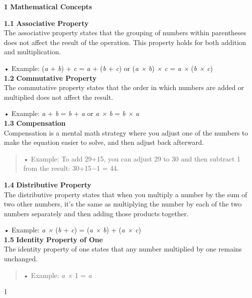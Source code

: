 \documentclass[
]{article}
\author{}
\date{}
\begin{document}
\textbf{1} \textbf{Mathematical Concepts}

\textbf{1.1} \textbf{Associative Property}\\
The associative property states that the grouping of numbers within
parentheses does not affect the result of the operation. This property
holds for both addition and multiplication.

• Example: (\emph{a} + \emph{b}) + \emph{c} = \emph{a} + (\emph{b} +
\emph{c}) or (\emph{a × b}) \emph{× c} = \emph{a ×} (\emph{b × c})\\
\textbf{1.2} \textbf{Commutative Property}\\
The commutative property states that the order in which numbers are
added or multiplied does not affect the result.

• Example: \emph{a} + \emph{b} = \emph{b} + \emph{a} or \emph{a × b} =
\emph{b × a}\\
\textbf{1.3} \textbf{Compensation}\\
Compensation is a mental math strategy where you adjust one of the
numbers to make the equation easier to solve, and then adjust back
afterward.

\begin{quote}
• Example: To add 29+15, you can adjust 29 to 30 and then subtract 1
from the result: 30+15\emph{−}1 = 44.
\end{quote}

\textbf{1.4} \textbf{Distributive Property}\\
The distributive property states that when you multiply a number by the
sum of two other numbers, it's the same as multiplying the number by
each of the two numbers separately and then adding those products
together.

• Example: \emph{a ×} (\emph{b} + \emph{c}) = (\emph{a × b}) + (\emph{a
× c})\\
\textbf{1.5} \textbf{Identity Property of One}\\
The identity property of one states that any number multiplied by one
remains unchanged.

\begin{quote}
• Example: \emph{a ×} 1 = \emph{a}
\end{quote}

1
\end{document}
